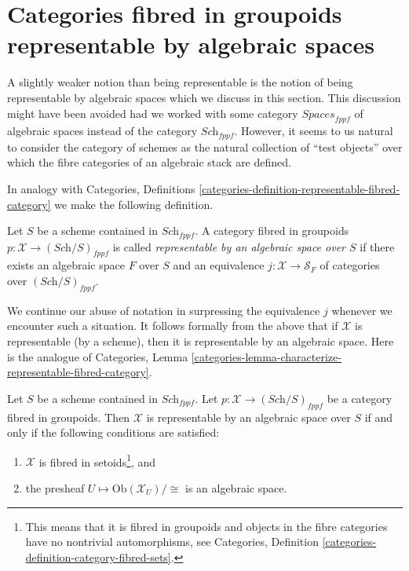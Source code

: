 \section{Categories fibred in groupoids representable by algebraic spaces}
\label{section-representable-by-algebraic-spaces}

\noindent
A slightly weaker notion than being representable is the notion of
being representable by algebraic spaces which we discuss in this section.
This discussion might have been avoided had we worked with some category
$\textit{Spaces}_{fppf}$ of algebraic spaces instead of the category
$\textit{Sch}_{fppf}$. However, it seems to us natural to consider the
category of schemes as the natural collection of ``test objects'' over
which the fibre categories of an algebraic stack are defined.

\medskip\noindent
In analogy with Categories, Definitions
\ref{categories-definition-representable-fibred-category}
we make the following definition.

\begin{definition}
\label{definition-representable-by-algebraic-space}
Let $S$ be a scheme contained in $\textit{Sch}_{fppf}$.
A category fibred in groupoids $p : \mathcal{X} \to (\textit{Sch}/S)_{fppf}$
is called {\it representable by an algebraic space over $S$}
if there exists an algebraic space $F$ over $S$ and an equivalence
$j : \mathcal{X} \to \mathcal{S}_F$
of categories over $(\textit{Sch}/S)_{fppf}$.
\end{definition}

\noindent
We continue our abuse of notation in surpressing the equivalence $j$
whenever we encounter such a situation.
It follows formally from the above that if $\mathcal{X}$ is
representable (by a scheme), then it is representable by an
algebraic space. Here is the analogue of
Categories,
Lemma \ref{categories-lemma-characterize-representable-fibred-category}.

\begin{lemma}
\label{lemma-characterize-representable-by-space}
Let $S$ be a scheme contained in $\textit{Sch}_{fppf}$.
Let $p : \mathcal{X} \to (\textit{Sch}/S)_{fppf}$
be a category fibred in groupoids.
Then $\mathcal{X}$ is representable by an algebraic space over $S$
if and only if the following conditions are satisfied:
\begin{enumerate}
\item $\mathcal{X}$ is fibred in setoids\footnote{This means that
it is fibred in groupoids and objects in the fibre categories
have no nontrivial automorphisms, see Categories,
Definition \ref{categories-definition-category-fibred-sets}.}, and
\item the presheaf $U \mapsto \text{Ob}(\mathcal{X}_U)/\cong$ is
an algebraic space.
\end{enumerate}
\end{lemma}


